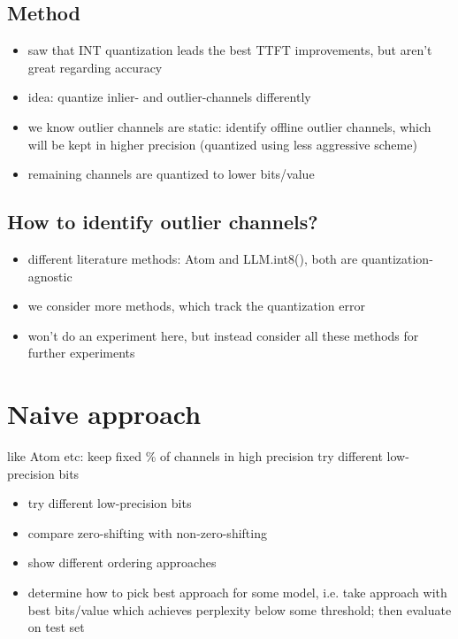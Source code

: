 \subsection{Method}
\begin{itemize}
    \item saw that INT quantization leads the best TTFT improvements, but aren't great regarding accuracy

    \item idea: quantize inlier- and outlier-channels differently
    \item we know outlier channels are static: identify offline outlier channels, which will be kept in higher precision (quantized using less aggressive scheme)
    \item remaining channels are quantized to lower bits/value
\end{itemize}


\subsection{How to identify outlier channels?}
\begin{itemize}
    \item different literature methods: Atom and LLM.int8(), both are quantization-agnostic
    \item we consider more methods, which track the quantization error
    \item won't do an experiment here, but instead consider all these methods for further experiments
\end{itemize} 

\section{Naive approach}
like Atom etc: keep fixed \% of channels in high precision
try different low-precision bits

\begin{itemize}
	\item try different low-precision bits
	\item compare zero-shifting with non-zero-shifting
	\item show different ordering approaches
	\item determine how to pick best approach for some model, i.e. take approach with best bits/value which achieves perplexity below some threshold; then evaluate on test set
\end{itemize}


